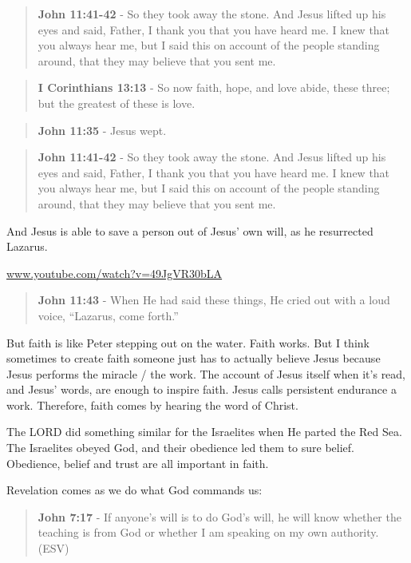 \documentclass[11pt]{article}
\begin{document}
\begin{quote}
\textbf{John 11:41-42} - So they took away the stone. And Jesus lifted up his eyes and said, Father, I thank you that you have heard me. I knew that you always hear me, but I said this on account of the people standing around, that they may believe that you sent me.
\end{quote}

\begin{quote}
\textbf{I Corinthians 13:13} - So now faith, hope, and love abide, these three; but the greatest of these is love.
\end{quote}

\begin{quote}
\textbf{John 11:35} - Jesus wept.
\end{quote}

\begin{quote}
\textbf{John 11:41-42} - So they took away the stone. And Jesus lifted up his eyes and said, Father, I thank you that you have heard me. I knew that you always hear me, but I said this on account of the people standing around, that they may believe that you sent me.
\end{quote}

And Jesus is able to save a person out of Jesus' own will, as he resurrected Lazarus.

\href{https://www.youtube.com/watch?v=49JgVR30bLA}{www.youtube.com/watch?v=49JgVR30bLA}

\begin{quote}
\textbf{John 11:43} - When He had said these things, He cried out with a loud voice, “Lazarus, come forth.”
\end{quote}

But faith is like Peter stepping out on the water. Faith works. But I think sometimes to create faith someone just has to actually believe Jesus because Jesus performs the miracle / the work. The account of Jesus itself when it's read, and Jesus' words, are enough to inspire faith. Jesus calls persistent endurance a work. Therefore, faith comes by hearing the word of Christ.

The LORD did something similar for the Israelites when He parted the Red Sea.
The Israelites obeyed God, and their obedience led them to sure belief.
Obedience, belief and trust are all important in faith.

Revelation comes as we do what God commands us:

\begin{quote}
\textbf{John 7:17} - If anyone's will is to do God's will, he will know whether the teaching is from God or whether I am speaking on my own authority. (ESV)
\end{quote}
\end{document}
